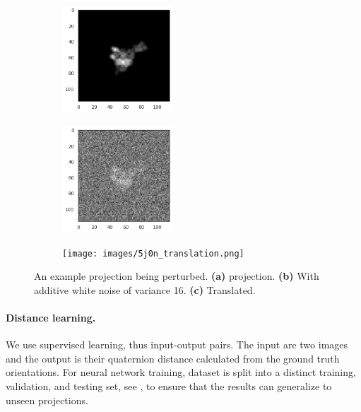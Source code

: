 \begin{figure}
    \centering
    \begin{subfigure}[b]{0.3\textwidth}
        \includegraphics[height=4cm]{images/5j0n_noise0.png}
        \caption{}
    \end{subfigure}
    \hfill
    \begin{subfigure}[b]{0.3\textwidth}
    \centering
        \includegraphics[height=4cm]{images/5j0n_noise16.png}
        \caption{}
    \end{subfigure}
    \hfill
    \begin{subfigure}[b]{0.3\textwidth}
    \centering
        \texttt{[image: images/5j0n\_translation.png]}
        \caption{}
    \end{subfigure}
    \caption{An example projection being perturbed.
    \textbf{(a)}  projection.
    \textbf{(b)} With additive white noise of variance 16.
    \textbf{(c)} Translated.}
    \label{fig:different-projections}
\end{figure}

\paragraph{Distance learning.}
We use supervised learning, thus input-output pairs.
The input are two images and the output is their quaternion distance calculated from the ground truth orientations.
For neural network training, dataset is split into a distinct training, validation, and testing set, see , to ensure that the results can generalize to unseen projections.

